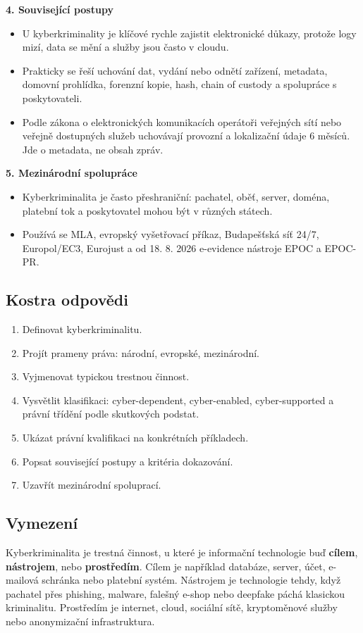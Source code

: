 \documentclass[11pt,a4paper]{article}
\begin{document}
\textbf{4. Související postupy}
\begin{itemize}
  \item U kyberkriminality je klíčové rychle zajistit elektronické důkazy, protože logy mizí, data se mění a služby jsou často v cloudu.
  \item Prakticky se řeší uchování dat, vydání nebo odnětí zařízení, metadata, domovní prohlídka, forenzní kopie, hash, chain of custody a spolupráce s poskytovateli.
  \item Podle zákona o elektronických komunikacích operátoři veřejných sítí nebo veřejně dostupných služeb uchovávají provozní a lokalizační údaje 6 měsíců. Jde o metadata, ne obsah zpráv.
\end{itemize}

\textbf{5. Mezinárodní spolupráce}
\begin{itemize}
  \item Kyberkriminalita je často přeshraniční: pachatel, oběť, server, doména, platební tok a poskytovatel mohou být v různých státech.
  \item Používá se MLA, evropský vyšetřovací příkaz, Budapešťská síť 24/7, Europol/EC3, Eurojust a od 18. 8. 2026 e-evidence nástroje EPOC a EPOC-PR.
\end{itemize}

\subsection*{Kostra odpovědi}
\begin{enumerate}
  \item Definovat kyberkriminalitu.
  \item Projít prameny práva: národní, evropské, mezinárodní.
  \item Vyjmenovat typickou trestnou činnost.
  \item Vysvětlit klasifikaci: cyber-dependent, cyber-enabled, cyber-supported a právní třídění podle skutkových podstat.
  \item Ukázat právní kvalifikaci na konkrétních příkladech.
  \item Popsat související postupy a kritéria dokazování.
  \item Uzavřít mezinárodní spoluprací.
\end{enumerate}

\subsection*{Vymezení}
Kyberkriminalita je trestná činnost, u které je informační technologie buď \textbf{cílem}, \textbf{nástrojem}, nebo \textbf{prostředím}. Cílem je například databáze, server, účet, e-mailová schránka nebo platební systém. Nástrojem je technologie tehdy, když pachatel přes phishing, malware, falešný e-shop nebo deepfake páchá klasickou kriminalitu. Prostředím je internet, cloud, sociální sítě, kryptoměnové služby nebo anonymizační infrastruktura.
\end{document}
